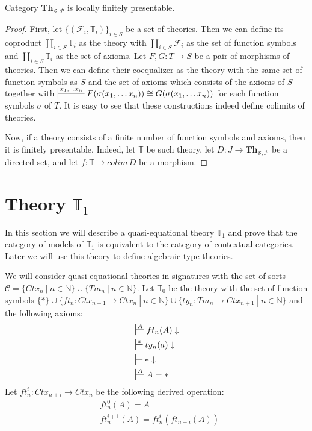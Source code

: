 \documentclass{amsart}
\theoremstyle{definition}
\theoremstyle{remark}
\newcommand{\cat}[1]{\mathbf{#1}}
\newcommand{\Th}{\cat{Th}}
\numberwithin{figure}{section}
\begin{document}
\begin{prop}
Category $\Th_{\mathcal{S},\mathcal{P}}$ is locally finitely presentable.
\end{prop}
\begin{proof}
First, let $\{ (\mathcal{F}_i,\mathbb{T}_i) \}_{i \in S}$ be a set of theories.
Then we can define its coproduct $\coprod\limits_{i \in S} \mathbb{T}_i$ as the theory with $\coprod\limits_{i \in S} \mathcal{F}_i$ as the set of function symbols and $\coprod\limits_{i \in S} \mathbb{T}_i$ as the set of axioms.
Let $F,G : T \to S$ be a pair of morphisms of theories.
Then we can define their coequalizer as the theory with the same set of function symbols as $S$ and the set of axioms which consists of the axioms of $S$
together with $\sststile{}{x_1, \ldots x_n} F(\sigma(x_1, \ldots x_n)) \cong G(\sigma(x_1, \ldots x_n))$ for each function symbols $\sigma$ of $T$.
It is easy to see that these constructions indeed define colimits of theories.

Now, if a theory consists of a finite number of function symbols and axioms, then it is finitely presentable.
Indeed, let $\mathbb{T}$ be such theory, let $D : J \to \Th_{\mathcal{S},\mathcal{P}}$ be a directed set, and let $f : \mathbb{T} \to colim\,D$ be a morphism.
\end{proof}

\label{sec:T1}
\section{Theory $\mathbb{T}_1$}

In this section we will describe a quasi-equational theory $\mathbb{T}_1$ and prove that the category of models of $\mathbb{T}_1$ is equivalent to the category of contextual categories.
Later we will use this theory to define algebraic type theories.

We will consider quasi-equational theories in signatures with the set of sorts $\mathcal{C} = \{ Ctx_n\ |\ n \in \mathbb{N} \} \cup \{ Tm_n\ |\ n \in \mathbb{N} \}$.
Let $\mathbb{T}_0$ be the theory with the set of function symbols $\{ * \} \cup \{ ft_n : Ctx_{n+1} \to Ctx_n\ |\ n \in \mathbb{N} \} \cup \{ ty_n : Tm_n \to Ctx_{n+1}\ |\ n \in \mathbb{N} \}$ and the following axioms:
\begin{align*}
& \sststile{}{A} ft_n(A) \downarrow \\
& \sststile{}{a} ty_n(a) \downarrow \\
& \sststile{}{} * \downarrow \\
& \sststile{}{A} A = *
\end{align*}
Let $ft^i_n : Ctx_{n+i} \to Ctx_n$ be the following derived operation:
\begin{align*}
& ft^0_n(A) = A \\
& ft^{i+1}_n(A) = ft^i_n(ft_{n+i}(A))
\end{align*}
\end{document}
